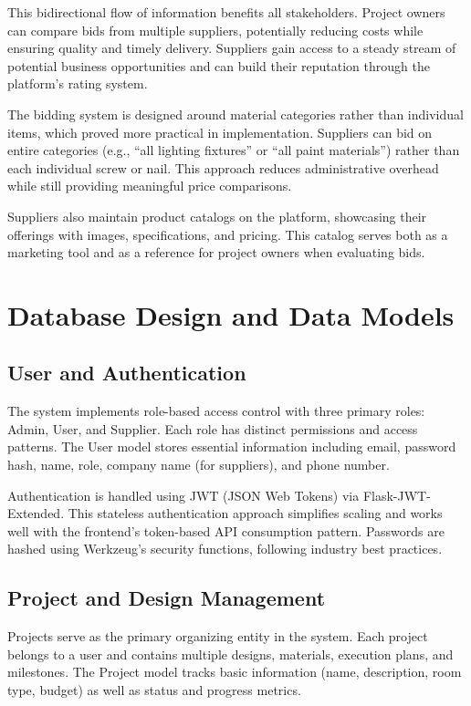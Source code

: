 \documentclass[conference]{IEEEtran}
\begin{document}
This bidirectional flow of information benefits all stakeholders. Project owners can compare bids from multiple suppliers, potentially reducing costs while ensuring quality and timely delivery. Suppliers gain access to a steady stream of potential business opportunities and can build their reputation through the platform's rating system.

The bidding system is designed around material categories rather than individual items, which proved more practical in implementation. Suppliers can bid on entire categories (e.g., ``all lighting fixtures'' or ``all paint materials'') rather than each individual screw or nail. This approach reduces administrative overhead while still providing meaningful price comparisons.

Suppliers also maintain product catalogs on the platform, showcasing their offerings with images, specifications, and pricing. This catalog serves both as a marketing tool and as a reference for project owners when evaluating bids.

\section{Database Design and Data Models}

\subsection{User and Authentication}
The system implements role-based access control with three primary roles: Admin, User, and Supplier. Each role has distinct permissions and access patterns. The User model stores essential information including email, password hash, name, role, company name (for suppliers), and phone number.

Authentication is handled using JWT (JSON Web Tokens) via Flask-JWT-Extended. This stateless authentication approach simplifies scaling and works well with the frontend's token-based API consumption pattern. Passwords are hashed using Werkzeug's security functions, following industry best practices.

\subsection{Project and Design Management}
Projects serve as the primary organizing entity in the system. Each project belongs to a user and contains multiple designs, materials, execution plans, and milestones. The Project model tracks basic information (name, description, room type, budget) as well as status and progress metrics.
\end{document}
